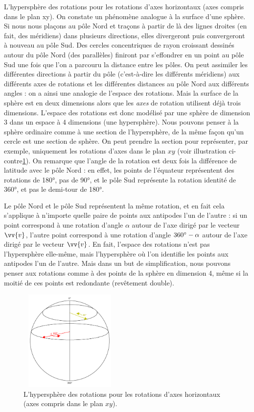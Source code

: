 L'hypersphère des rotations pour les rotations d'axes horizontaux (axes compris dans le plan xy).
On constate un phénomène analogue à la surface d'une sphère. Si nous nous plaçons au pôle Nord et traçons à partir de là des lignes droites (en fait, des méridiens) dans plusieurs directions, elles divergeront puis convergeront à nouveau au pôle Sud. Des cercles concentriques de rayon croissant dessinés autour du pôle Nord (des parallèles) finiront par s'effondrer en un point au pôle Sud une fois que l'on a parcouru la distance entre les pôles. On peut assimiler les différentes directions à partir du pôle (c'est-à-dire les différents méridiens) aux différents axes de rotations et les différentes distances au pôle Nord aux différents angles : on a ainsi une analogie de l'espace des rotations. Mais la surface de la sphère est en deux dimensions alors que les \emph{axes} de rotation utilisent déjà trois dimensions. L'espace des rotations est donc modélisé par une sphère de dimension 3 dans un espace à 4 dimensions (une hypersphère). Nous pouvons penser à la sphère ordinaire comme à une section de l'hypersphère, de la même façon qu'un cercle est une section de sphère. On peut prendre la section pour représenter, par exemple, uniquement les rotations d'axes dans le plan $xy$ (voir illustration ci-contre\ref{hypersphere_rotations}). On remarque que l'angle de la rotation est deux fois la différence de latitude avec le pôle Nord : en effet, les points de l'équateur représentent des rotations de \ang{180}, pas de \ang{90}, et le pôle Sud représente la rotation identité de \ang{360}, et pas le demi-tour de \ang{180}.

Le pôle Nord et le pôle Sud représentent la même rotation, et en fait cela s'applique à n'importe quelle paire de points aux antipodes l'un de l'autre : si un point correspond à une rotation d'angle $\alpha$ autour de l'axe dirigé par le vecteur $\vv{v}$, l'autre point correspond à une rotation d'angle $\text{\ang{360}} - \alpha$ autour de l'axe dirigé par le vecteur $\vv{v}$. En fait, l'espace des rotations n'est pas l'hypersphère elle-même, mais l'hypersphère où l'on identifie les points aux antipodes l'un de l'autre. Mais dans un but de simplification, nous pouvons penser aux rotations comme à des points de la sphère en dimension 4, même si la moitié de ces points est redondante (revêtement double).

\begin{figure}[ht]
	\centering
	\includegraphics[width=5cm,height=5cm]{ressources/hypersphere_rotations}\hfill
	\caption{L'hypersphère des rotations pour les rotations d'axes horizontaux (axes compris dans le plan $xy$).}
	\label{hypersphere_rotations}
\end{figure}